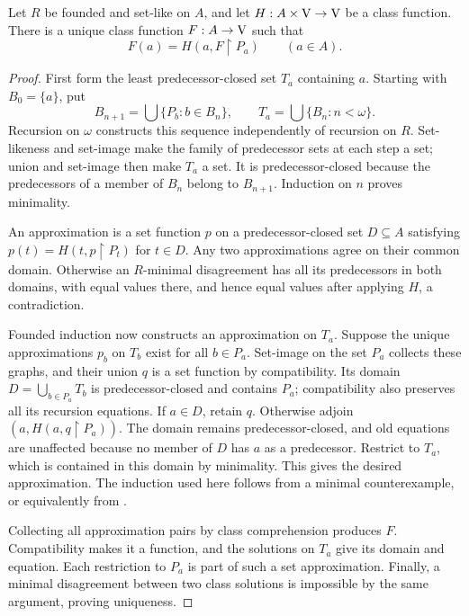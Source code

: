 \begin{theorem}
\label{thm:setlike_class_recursion}
Let $R$ be founded and set-like on $A$, and let
$H:A\times\mathrm{V}\to\mathrm{V}$ be a class function. There is a unique class
function $F:A\to\mathrm{V}$ such that
\[
F(a)=H(a,F\restriction P_a)\qquad(a\in A).
\]
\end{theorem}
\begin{proof}
First form the least predecessor-closed set $T_a$ containing $a$.
Starting with $B_0=\{a\}$, put
\[
B_{n+1}=\bigcup\{P_b:b\in B_n\},\qquad
T_a=\bigcup\{B_n:n<\omega\}.
\]
Recursion on $\omega$ constructs this sequence independently of recursion
on $R$. Set-likeness and set-image make the family of predecessor sets
at each step a set; union and set-image then make $T_a$ a set.
It is predecessor-closed because the predecessors of a member of $B_n$
belong to $B_{n+1}$. Induction on $n$ proves minimality.

An approximation is a set function $p$ on a predecessor-closed set
$D\subseteq A$ satisfying $p(t)=H(t,p\restriction P_t)$ for $t\in D$.
Any two approximations agree on their common domain. Otherwise an
$R$-minimal disagreement has all its predecessors in both domains, with
equal values there, and hence equal values after applying $H$, a
contradiction.

Founded induction now constructs an approximation on $T_a$. Suppose the
unique approximations $p_b$ on $T_b$ exist for all $b\in P_a$.
Set-image on the set $P_a$ collects these graphs, and their union $q$ is
a set function by compatibility. Its domain
$D=\bigcup_{b\in P_a}T_b$ is predecessor-closed and contains $P_a$;
compatibility also preserves all its recursion equations. If $a\in D$,
retain $q$. Otherwise adjoin $(a,H(a,q\restriction P_a))$. The domain
remains predecessor-closed, and old equations are unaffected because
no member of $D$ has $a$ as a predecessor. Restrict to $T_a$, which is
contained in this domain by minimality. This gives the desired
approximation. The induction used here follows from a minimal
counterexample, or equivalently from .

Collecting all approximation pairs by class comprehension produces $F$.
Compatibility makes it a function, and the solutions on $T_a$ give its
domain and equation. Each restriction to $P_a$ is part of such a set
approximation. Finally, a minimal disagreement between two class solutions
is impossible by the same argument, proving uniqueness.
\end{proof}
\iffalse
